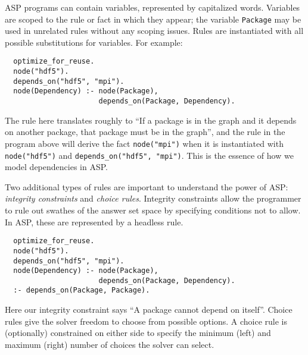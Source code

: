 ASP programs can contain variables, represented by capitalized words. Variables are
scoped to the rule or fact in which they appear; the variable {\tt Package} may be used
in unrelated rules without any scoping issues. Rules are instantiated with all possible
substitutions for variables. For example:


\begin{verbatim}
  optimize_for_reuse.
  node("hdf5").
  depends_on("hdf5", "mpi").
  node(Dependency) :- node(Package),
                      depends_on(Package, Dependency).
\end{verbatim}

The rule here translates roughly to ``If a package is in the graph and it depends on
another package, that package must be in the graph'', and the rule in the program above
will derive the fact {\tt node("mpi")} when it is instantiated with {\tt
  node("hdf5")} and {\tt depends\_on("hdf5", "mpi")}. This is the essence of how
  we model dependencies in ASP.

Two additional types of rules are important to understand the power of ASP:
\textit{integrity constraints} and \textit{choice rules}.
Integrity constraints allow the programmer to rule out swathes of the answer set space
by specifying conditions not to allow. In ASP, these are represented by a headless rule.

\begin{verbatim}
  optimize_for_reuse.
  node("hdf5").
  depends_on("hdf5", "mpi").
  node(Dependency) :- node(Package),
                      depends_on(Package, Dependency).
  :- depends_on(Package, Package).
\end{verbatim}

Here our integrity constraint says ``A package cannot depend on itself''.
Choice rules give the solver freedom to choose from possible options. A choice rule is
(optionally) constrained on either side to specify the minimum (left) and maximum
(right) number of choices the solver can select.

